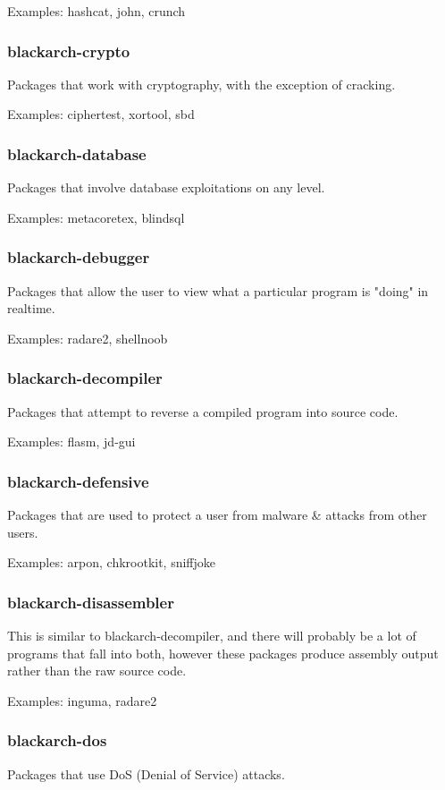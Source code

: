 \documentclass[a4paper, oneside, 11pt]{book}
\begin{document}
Examples: hashcat, john, crunch

\subsubsection{blackarch-crypto}
Packages that work with cryptography, with the exception of cracking.

Examples: ciphertest, xortool, sbd

\subsubsection{blackarch-database}
Packages that involve database exploitations on any level.

Examples: metacoretex, blindsql

\subsubsection{blackarch-debugger}
Packages that allow the user to view what a particular program is "doing" in realtime.

Examples: radare2, shellnoob

\subsubsection{blackarch-decompiler}
Packages that attempt to reverse a compiled program into source code.

Examples: flasm, jd-gui

\subsubsection{blackarch-defensive}
Packages that are used to protect a user from malware \& attacks from other users.

Examples: arpon, chkrootkit, sniffjoke

\subsubsection{blackarch-disassembler}
This is similar to blackarch-decompiler, and there will probably be a lot
of programs that fall into both, however these packages produce assembly output
rather than the raw source code.

Examples: inguma, radare2

\subsubsection{blackarch-dos}
Packages that use DoS (Denial of Service) attacks.
\end{document}
